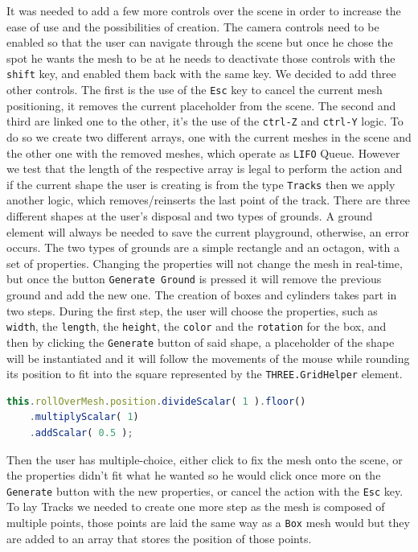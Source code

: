 \documentclass{scrbook}
\begin{document}
It was needed to add a few more controls over the scene in order to increase the ease of use and the possibilities of creation. The camera controls need to be enabled so that the user can navigate through the scene but once he chose the spot he wants 
the mesh to be at he needs to deactivate those controls with the \texttt{shift} key, and enabled them back with the same key. We decided to add three other controls. The first is the use of the \texttt{Esc} key to cancel the current mesh positioning, it removes the current placeholder from the scene. 
The second and third are linked one to the other, it's the use of the \texttt{ctrl-Z} and \texttt{ctrl-Y} logic. To do so we create two different arrays, one with the current meshes in the scene and the other one with the removed meshes, which operate as \texttt{LIFO} Queue.
However we test that the length of the respective array is legal to perform the action and if the current shape the user is creating is from the type \texttt{Tracks} then we apply another logic, which removes/reinserts the last point of the track.
There are three different shapes at the user's disposal and two types of grounds. A ground element will always be needed to save the current playground, otherwise, an error occurs. The two types of grounds are a simple rectangle and an octagon, with a set of properties. 
Changing the properties will not change the mesh in real-time, but once the button \texttt{Generate Ground} is pressed it will remove the previous ground and add the new one. The creation of boxes and cylinders takes part in two steps. 
During the first step, the user will choose the properties, such as \texttt{width}, the \texttt{length}, the \texttt{height}, the \texttt{color} and the \texttt{rotation} for the box, and then by clicking the \texttt{Generate} button of said shape, 
a placeholder of the shape will be instantiated and it will follow the movements of the mouse while rounding its position to fit into the square represented by the \texttt{THREE.GridHelper} element. 
\begin{lstlisting}[language=JavaScript, basicstyle=\ttfamily\small]
  this.rollOverMesh.position.divideScalar( 1 ).floor()
    .multiplyScalar( 1)
    .addScalar( 0.5 );
\end{lstlisting} 
Then the user has multiple-choice, either click to fix the mesh onto the scene, or the properties didn't fit what he wanted so he would click once more on the \texttt{Generate} button with the new properties, 
or cancel the action with the \texttt{Esc} key. 
To lay Tracks we needed to create one more step as the mesh is composed of multiple points, those points are laid the same way as a \texttt{Box} mesh would but they are added to an array that stores the position of those points. 
\end{document}

